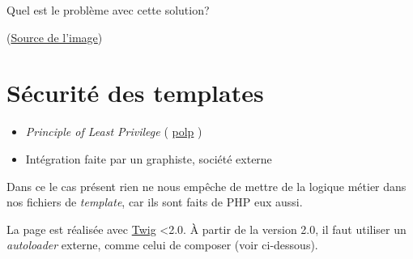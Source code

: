 Quel est le problème avec cette solution?

(\href{https://raw.githubusercontent.com/cyrilmanuel/picbot/e6ff24a8bfd7ee9f0514a4fd8f49b1255ef26178/picbot/Images/meme10.jpg}{Source
de l'image})

\hypertarget{suxe9curituxe9-des-templates}{%
\section{Sécurité des templates}\label{suxe9curituxe9-des-templates}}

\begin{itemize}
\tightlist
\item
  \emph{Principle of Least Privilege} (
  \href{https://en.wikipedia.org/wiki/Principle_of_least_privilege}{polp}
  )
\item
  Intégration faite par un graphiste, société externe
\end{itemize}

Dans ce le cas présent rien ne nous empêche de mettre de la logique
métier dans nos fichiers de \emph{template}, car ils sont faits de PHP
eux aussi.

\begin{english}

\begin{Shaded}
\begin{Highlighting}[]

\KeywordTok{\textgreater{}}
\KeywordTok{\textgreater{}}
\end{Highlighting}
\end{Shaded}

\end{english}

La page est réalisée avec \href{http://twig.sensiolabs.org/}{Twig}
\textless2.0. À partir de la version 2.0, il faut utiliser un
\emph{autoloader} externe, comme celui de composer (voir ci-dessous).


